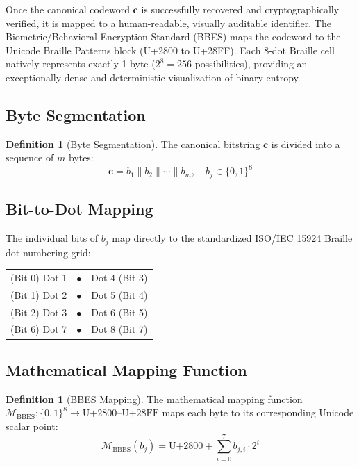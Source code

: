\documentclass[11pt,twoside]{amsart}
\theoremstyle{plain}
\theoremstyle{definition}
\newtheorem{definition}[theorem]{Definition}
\theoremstyle{remark}
\newcommand{\bc}{\mathbf{c}}
\newcommand{\calM}{\mathcal{M}}
\begin{document}
Once the canonical codeword $\bc$ is successfully recovered and cryptographically verified, it is mapped to a human-readable, visually auditable identifier. The Biometric/Behavioral Encryption Standard (BBES) maps the codeword to the Unicode Braille Patterns block (U+2800 to U+28FF). Each 8-dot Braille cell natively represents exactly 1 byte ($2^8 = 256$ possibilities), providing an exceptionally dense and deterministic visualization of binary entropy.

\subsection{Byte Segmentation}

\begin{definition}[Byte Segmentation]
\label{def:bytes}
The canonical bitstring $\bc$ is divided into a sequence of $m$ bytes:
\begin{equation}
\bc = b_1 \| b_2 \| \cdots \| b_m, \quad b_j \in \{0, 1\}^8
\end{equation}
\end{definition}

\subsection{Bit-to-Dot Mapping}

The individual bits of $b_j$ map directly to the standardized ISO/IEC 15924 Braille dot numbering grid:

\begin{center}
\begin{tabular}{c c c}
(Bit 0) Dot 1 & $\bullet$ & Dot 4 (Bit 3) \\
(Bit 1) Dot 2 & $\bullet$ & Dot 5 (Bit 4) \\
(Bit 2) Dot 3 & $\bullet$ & Dot 6 (Bit 5) \\
(Bit 6) Dot 7 & $\bullet$ & Dot 8 (Bit 7)
\end{tabular}
\end{center}

\subsection{Mathematical Mapping Function}

\begin{definition}[BBES Mapping]
\label{def:bbes}
The mathematical mapping function $\calM_{\text{BBES}}: \{0, 1\}^8 \rightarrow \text{U+2800--U+28FF}$ maps each byte to its corresponding Unicode scalar point:
\begin{equation}
\calM_{\text{BBES}}(b_j) = \text{U+2800} + \sum_{i=0}^{7} b_{j,i} \cdot 2^i
\end{equation}
\end{definition}
\end{document}
